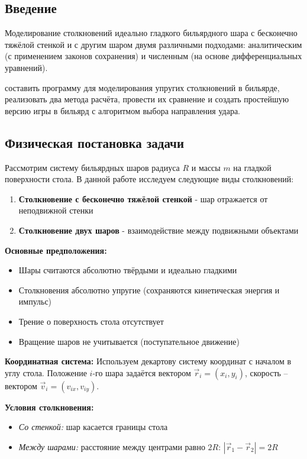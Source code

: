 \newpage

\begin{center}
    \section{Введение}
\end{center}

\Task Моделирование столкновений идеально гладкого бильярдного шара с бесконечно тяжёлой стенкой и с другим шаром двумя различными подходами: аналитическим (с применением законов сохранения) и численным (на основе дифференциальных уравнений).

\Goal составить программу для моделирования упругих столкновений в бильярде, реализовать два метода расчёта, провести их сравнение и создать простейшую версию игры в бильярд с алгоритмом выбора направления удара.

\begin{center}
    \section{Физическая постановка задачи}
\end{center}
\vspace{-2em}

Рассмотрим систему бильярдных шаров радиуса $R$ и массы $m$ на гладкой поверхности стола. В данной работе исследуем следующие виды столкновений:

\begin{enumerate}
    \item \textbf{Столкновение с бесконечно тяжёлой стенкой} - шар отражается от неподвижной стенки
    \item \textbf{Столкновение двух шаров} - взаимодействие между подвижными объектами
\end{enumerate}

\textbf{Основные предположения:}
\begin{itemize}
    \item Шары считаются абсолютно твёрдыми и идеально гладкими
    \item Столкновения абсолютно упругие (сохраняются кинетическая энергия и импульс)
    \item Трение о поверхность стола отсутствует
    \item Вращение шаров не учитывается (поступательное движение)
\end{itemize}

\textbf{Координатная система:}
Используем декартову систему координат с началом в углу стола. Положение $i$-го шара задаётся вектором $\vec{r}_i = (x_i, y_i)$, скорость -- вектором $\vec{v}_i = (v_{ix}, v_{iy})$.

\textbf{Условия столкновения:}
\begin{itemize}
    \item \textit{Со стенкой:} шар касается границы стола
    \item \textit{Между шарами:} расстояние между центрами равно $2R$: $|\vec{r}_1 - \vec{r}_2| = 2R$
\end{itemize}

\newpage